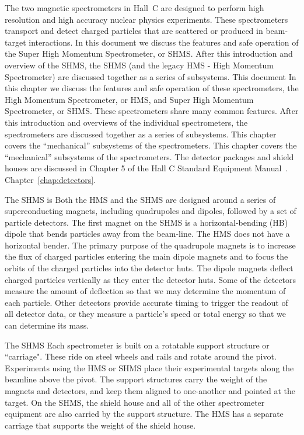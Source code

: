 
	The two magnetic spectrometers in Hall~C are designed to perform
high resolution and high accuracy nuclear physics experiments.  These
spectrometers transport and detect charged particles that are scattered or produced
in beam-target interactions.
\ifdefined\SHMSMAGNETSOSP
In this document we discuss the features and safe operation of
the Super High Momentum Spectrometer, or SHMS.
After this introduction and overview of the SHMS, the
SHMS (and the legacy HMS - High Momentum Spectrometer)
are discussed together as a series of subsystems.
This document
\else
In this chapter
we discuss the features and safe operation of these spectrometers,
the High Momentum Spectrometer, or HMS,
and Super High Momentum Spectrometer, or SHMS.
These spectrometers
share many common features.  After this
introduction and overviews of the individual spectrometers, the
spectrometers are discussed together as a series of subsystems.
This chapter covers the ``mechanical'' subsystems of the spectrometers.
This chapter
\fi
covers the ``mechanical'' subsystems of the spectrometers.
The detector packages and
shield houses are discussed in
\ifdefined\SHMSMAGNETSOSP
Chapter 5 of the Hall C Standard Equipment Manual~\cite{HallCosp}.
\else
Chapter~\ref{chap:detectors}.
\fi

\ifdefined\SHMSMAGNETSOSP
The SHMS is
\else
Both the HMS and the SHMS are
\fi
designed around a series of superconducting magnets,
including quadrupoles and dipoles, followed by a set of particle detectors.  The first
magnet on the SHMS is a horizontal-bending (HB) dipole that bends particles
away from the beam-line.
\ifdefined\SHMSMAGNETSOSP\else
The HMS does not have a horizontal bender.
\fi
The primary purpose of the quadrupole magnets is to increase the flux of
charged particles entering the main dipole magnets and to focus the orbits of the
charged particles into the detector huts.
The dipole magnets deflect charged particles vertically
as they enter the detector huts. Some of the detectors measure the amount of deflection
so that we may
determine the momentum of each particle. Other detectors provide accurate timing
to trigger the readout of all detector data, or they measure a particle's speed
or total energy so that we can determine its mass.

\ifdefined\SHMSMAGNETSOSP
The SHMS
\else
Each spectrometer
\fi
is built on a rotatable support structure or ``carriage".
These ride on steel
wheels and rails and rotate around the pivot. Experiments using the HMS or
SHMS place their experimental targets along the beamline above the pivot.
The support structures carry the weight of the magnets and detectors, and keep
them aligned to one-another and pointed at the target. On the SHMS, the shield
house and all of the
other spectrometer equipment are also carried by the support structure.
\ifdefined\SHMSMAGNETSOSP\else
The
HMS has a separate carriage that supports the weight of the shield house.
\fi

